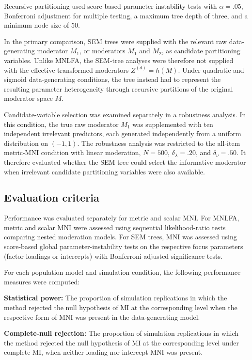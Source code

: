\documentclass[
  man,
  floatsintext]{apa7}
\begin{document}
Recursive partitioning used score-based parameter-instability tests with
\(\alpha=.05\), Bonferroni adjustment for multiple testing, a maximum
tree depth of three, and a minimum node size of 50.

In the primary comparison, SEM trees were supplied with the relevant raw
data-generating moderator \(M_1\), or moderators \(M_1\) and \(M_2\), as
candidate partitioning variables. Unlike MNLFA, the SEM-tree analyses
were therefore not supplied with the effective transformed moderators
\(Z^{(d)}=h(M)\). Under quadratic and sigmoid data-generating
conditions, the tree instead had to represent the resulting parameter
heterogeneity through recursive partitions of the original moderator
space \(M\).

Candidate-variable selection was examined separately in a robustness
analysis. In this condition, the true raw moderator \(M_1\) was
supplemented with ten independent irrelevant predictors, each generated
independently from a uniform distribution on \((-1,1)\). The robustness
analysis was restricted to the all-item metric-MNI condition with linear
moderation, \(N=500\), \(\delta_\lambda=.20\), and \(\delta_\nu=.50\).
It therefore evaluated whether the SEM tree could select the informative
moderator when irrelevant candidate partitioning variables were also
available.

\subsection{Evaluation criteria}\label{evaluation-criteria}

Performance was evaluated separately for metric and scalar MNI. For
MNLFA, metric and scalar MNI were assessed using sequential
likelihood-ratio tests comparing nested moderation models. For SEM
trees, MNI was assessed using score-based global parameter-instability
tests on the respective focus parameters (factor loadings or intercepts)
with Bonferroni-adjusted significance tests.

For each population model and simulation condition, the following
performance measures were computed:

\textbf{Statistical power:} The proportion of simulation replications in
which the method rejected the null hypothesis of MI at the corresponding
level when the respective form of MNI was present in the data-generating
model.

\textbf{Complete-null rejection:} The proportion of simulation
replications in which the method rejected the null hypothesis of MI at
the corresponding level under complete MI, when neither loading nor
intercept MNI was present.
\end{document}
